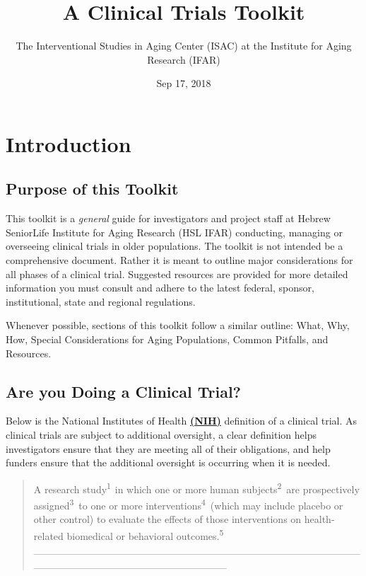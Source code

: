 \documentclass[]{book}
\title{A Clinical Trials Toolkit}
\author{The Interventional Studies in Aging Center (ISAC) at the Institute for
Aging Research (IFAR)}
\date{Sep 17, 2018}
\theoremstyle{definition}
\theoremstyle{definition}
\theoremstyle{definition}
\theoremstyle{remark}
\begin{document}
\maketitle

{
\setcounter{tocdepth}{1}
\tableofcontents
}
\clearpage 

\chapter{Introduction}\label{introduction}

\section{Purpose of this Toolkit}\label{purpose-of-this-toolkit}

This toolkit is a \emph{general} guide for investigators and project
staff at Hebrew SeniorLife Institute for Aging Research (HSL IFAR)
conducting, managing or overseeing clinical trials in older populations.
The toolkit is not intended be a comprehensive document. Rather it is
meant to outline major considerations for all phases of a clinical
trial. Suggested resources are provided for more detailed information
you must consult and adhere to the latest federal, sponsor,
institutional, state and regional regulations.

Whenever possible, sections of this toolkit follow a similar outline:
What, Why, How, Special Considerations for Aging Populations, Common
Pitfalls, and Resources.

\section{Are you Doing a Clinical
Trial?}\label{are-you-doing-a-clinical-trial}

Below is the National Institutes of Health
\href{https://grants.nih.gov/grants/guide/notice-files/NOT-OD-15-015.html}{\textbf{(NIH)}}
definition of a clinical trial. As clinical trials are subject to
additional oversight, a clear definition helps investigators ensure that
they are meeting all of their obligations, and help funders ensure that
the additional oversight is occurring when it is needed.

\begin{quote}
A research study\textsuperscript{1~}in which one or more human
subjects\textsuperscript{2}~are prospectively
assigned\textsuperscript{3}~to one or more
interventions\textsuperscript{4}~(which may include placebo or other
control) to evaluate the effects of those interventions on
health-related biomedical or behavioral outcomes.\textsuperscript{5}
\_\_\_\_\_\_\_\_\_\_\_\_\_\_\_\_\_\_\_\_\_\_\_\_\_\_\_\_\_\_\_\_\_\_\_\_\_\_\_\_\_\_\_\_\_\_\_\_\_\_\_\_\_\_\_\_\_\_\_\_\_\_\_\_\_\_\_\_\_\_
\end{quote}
\end{document}
